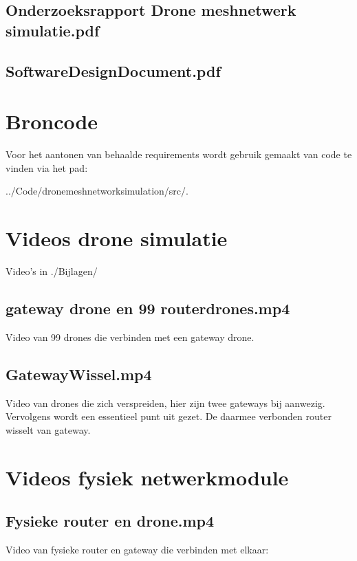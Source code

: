\documentclass[a4paper, 11pt, oneside]{report}
\begin{document}
\section[Onderzoeksrapport Drone meshnetwerk simulatie]{Onderzoeksrapport Drone meshnetwerk simulatie.pdf}\label{sec:onderzoeksrapport-drone-meshnetwerk-simulatie}
\section[Softwaredesign document]{SoftwareDesignDocument.pdf}\label{sec:softwaredesigndocument}


\chapter{Broncode}
\label{app:broncode}
Voor het aantonen van behaalde requirements wordt gebruik gemaakt van code te vinden via het pad:

../Code/drone\textunderscore meshnetwork\textunderscore simulation/src/.

\chapter{Videos drone simulatie}\label{sec:videos-drone-simulatie}
Video's in ./Bijlagen/
\section{gateway drone en 99 routerdrones.mp4}\label{sec:gateway-drone-en-99-routerdronesmp4}
Video van 99 drones die verbinden met een gateway drone.

\section{GatewayWissel.mp4}\label{sec:gatewaywisselmp4}
Video van drones die zich verspreiden, hier zijn twee gateways bij aanwezig.
Vervolgens wordt een essentieel punt uit gezet. 
De daarmee verbonden router wisselt van gateway. 

\chapter{Videos fysiek netwerkmodule}
\section{Fysieke router en drone.mp4}\label{sec:fysieke-router-en-dronemp4}
Video van fysieke router en gateway die verbinden met elkaar:
\end{document}
